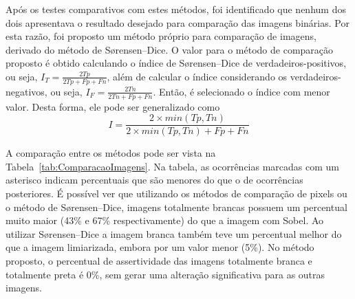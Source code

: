 \documentclass[12pt,oneside,a4paper,english,french,spanish,brazil,]{abntex2}
\begin{document}
Após os testes comparativos com estes métodos, foi identificado que nenhum dos dois apresentava o resultado desejado para comparação das imagens binárias. Por esta razão, foi proposto um método próprio para comparação de imagens, derivado do método de Sørensen–Dice. O valor para o método de comparação proposto é obtido calculando o índice de Sørensen–Dice de verdadeiros-positivos, ou seja, \(I_T = \frac{2Tp}{2Tp + Fp + Fn}\), além de calcular o índice considerando os verdadeiros-negativos, ou seja, \(I_F = \frac{2Tn}{2Tn + Fp + Fn}\). Então, é selecionado o índice com menor valor. Desta forma, ele pode ser generalizado como
\[I = \frac{2 \times min(Tp, Tn)}{2 \times min(Tp, Tn) + Fp + Fn}\]

A comparação entre os métodos pode ser vista na Tabela~\ref{tab:ComparacaoImagens}. Na tabela, as ocorrências marcadas com um asterisco indicam percentuais que são menores do que o de ocorrências posteriores. É possível ver que utilizando os métodos de comparação de pixels ou o método de Sørensen–Dice, imagens totalmente brancas possuem um percentual muito maior (43\% e 67\% respectivamente) do que a imagem com Sobel. Ao utilizar Sørensen–Dice a imagem branca também teve um percentual melhor do que a imagem limiarizada, embora por um valor menor (5\%). No método proposto, o percentual de assertividade das imagens totalmente branca e totalmente preta é 0\%, sem gerar uma alteração significativa para as outras imagens.
\end{document}
